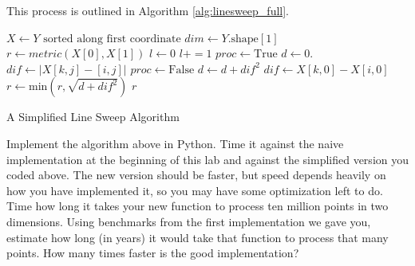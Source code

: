 This process is outlined in Algorithm \ref{alg:linesweep_full}.
\begin{algorithm}
\begin{algorithmic}[1]
	\State $X \gets Y \text{ sorted along first coordinate}$
	\State $dim \gets Y.\text{shape}\left[1\right]$
	\State $r \gets metric\left(X\left[0\right], X\left[1\right]\right)$
	\State $l \gets 0$
			\State $l += 1$
		\EndWhile
			\State $proc \gets \text{True}$
			\State $d \gets 0.$
				\State $dif \gets \left|X\left[k,j\right] - \left[i, j\right]\right|$
					\State $proc \gets \text{False}$
					\State {}
				\EndIf
				\State $d \gets d + dif^2$
			\EndFor
				\State $dif \gets X\left[k,0\right] - X\left[i,0\right]$
				\State $r \gets \text{min}\left(r, \sqrt{d + dif^2}\right)$
			\EndIf
		\EndFor
	\EndFor
	\State {} $r$
\EndProcedure
\end{algorithmic}
\caption{A Simplified Line Sweep Algorithm}
\label{alg:linesweep_full}
\end{algorithm}


\begin{problem}
Implement the algorithm above in Python. 
Time it against the naive implementation at the beginning of this lab and against the simplified version you coded above.
The new version should be faster, but speed depends heavily on how you have implemented it, so you may have some optimization left to do.
Time how long it takes your new function to process ten million points in two dimensions. 
Using benchmarks from the first implementation we gave you, estimate how long (in years) it would take that function to process that many points.
How many times faster is the good implementation?
\end{problem}

